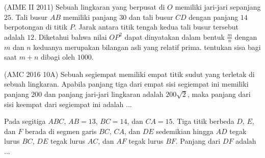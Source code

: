 \documentclass[11pt]{scrartcl}
\begin{document}
\begin{problem}
    (AIME II 2011) Sebuah lingkaran yang berpusat di $O$ memiliki jari-jari sepanjang $25$. Tali busur $AB$ memiliki panjang $30$ dan tali busur $CD$ dengan panjang $14$ berpotongan di titik $P$. Jarak antara titik tengah kedua tali busur tersebut adalah $12$. Diketahui bahwa nilai $OP^2$ dapat dinyatakan dalam bentuk $\frac{m}{n}$ dengan $m$ dan $n$ keduanya merupakan bilangan asli yang relatif prima. tentukan sisa bagi saat $m + n$ dibagi oleh $1000$.
\end{problem}

\begin{problem}
    (AMC 2016 10A) Sebuah segiempat memiliki empat titik sudut yang terletak di sebuah lingkaran. Apabila panjang tiga dari empat sisi segiempat ini memiliki panjang $200$ dan panjang jari-jari lingkaran adalah $200\sqrt{2}$, maka panjang dari sisi keempat dari segiempat ini adalah ...
\end{problem}

\begin{problem}
    Pada segitiga $ABC$, $AB=13$, $BC=14$, dan $CA=15$. Tiga titik berbeda $D$, $E$, dan $F$ berada di segmen garis $BC$, $CA$, dan $DE$ sedemikian hingga $AD$ tegak lurus $BC$, $DE$ tegak lurus $AC$, dan $AF$ tegak lurus $BF$. Panjang dari $DF$ adalah ...
\end{problem}
\end{document}
